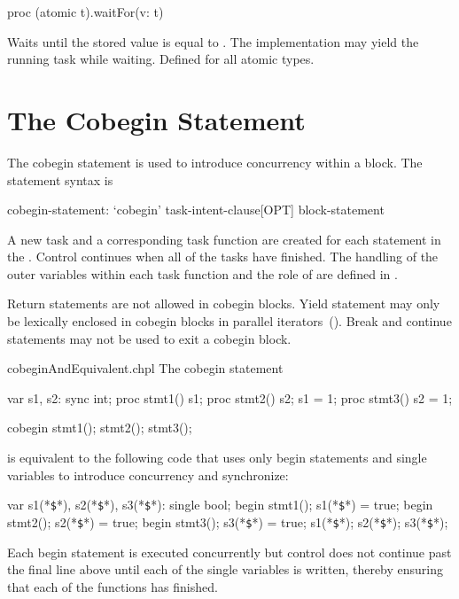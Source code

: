 \begin{protohead}
proc (atomic t).waitFor(v: t)
\end{protohead}
\begin{protobody}
Waits until the stored value is equal to . The implementation
may yield the running task while waiting.  Defined for all atomic types.
\end{protobody}



\section{The Cobegin Statement}
\label{Cobegin}

The cobegin statement is used to introduce concurrency within a
block.  The  statement syntax is
\begin{syntax}
cobegin-statement:
  `cobegin' task-intent-clause[OPT] block-statement
\end{syntax}

A new task and a corresponding task function are created for each statement
in the .  Control
continues when all of the tasks have finished.
The handling of the outer variables within each task function and
the role of  are defined in .

Return statements are not allowed in cobegin blocks.  Yield statement
may only be lexically enclosed in cobegin blocks in parallel
iterators~().  Break and continue statements
may not be used to exit a cobegin block.


\begin{chapelexample}{cobeginAndEquivalent.chpl}
The cobegin statement
\begin{chapelpre}
var s1, s2: sync int;
proc stmt1() { s1; }
proc stmt2() { s2; s1 = 1; }
proc stmt3() { s2 = 1; }
\end{chapelpre}
\begin{chapel}
cobegin {
  stmt1();
  stmt2();
  stmt3();
}
\end{chapel}
is equivalent to the following code that uses only begin statements
and single variables to introduce concurrency and synchronize:
\begin{chapel}
var s1(*\texttt{\$}*), s2(*\texttt{\$}*), s3(*\texttt{\$}*): single bool;
begin { stmt1(); s1(*\texttt{\$}*) = true; }
begin { stmt2(); s2(*\texttt{\$}*) = true; }
begin { stmt3(); s3(*\texttt{\$}*) = true; }
s1(*\texttt{\$}*); s2(*\texttt{\$}*); s3(*\texttt{\$}*);
\end{chapel}
\begin{chapeloutput}
\end{chapeloutput}
Each begin statement is executed concurrently but control does not
continue past the final line above until each of the single variables
is written, thereby ensuring that each of the functions has finished.
\end{chapelexample}

